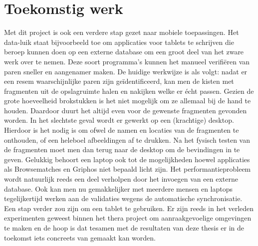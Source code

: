 \chapter{Toekomstig werk}
\label{toekomst}

Met dit project is ook een verdere stap gezet naar mobiele toepassingen. Het data-luik staat bijvoorbeeld toe om applicaties voor tablets te schrijven die beroep kunnen doen op een externe database om een groot deel van het zware werk over te nemen. Deze soort programma's kunnen het manueel verifi\"eren van paren sneller en aangenamer maken. De huidige werkwijze is als volgt: nadat er een resem waarschijnlijke paren zijn ge\"identificeerd, kan men de kisten met fragmenten uit de opslagruimte halen en nakijken welke er \'echt passen. Gezien de grote hoeveelheid brokstukken is het niet mogelijk om ze allemaal bij de hand te houden. Daardoor duurt het altijd even voor de gewenste fragmenten gevonden worden. In het slechtste geval wordt er gewerkt op een (krachtige) desktop. Hierdoor is het nodig is om ofwel de namen en locaties van de fragmenten te onthouden, of een heleboel afbeeldingen af te drukken. Na het fysisch testen van de fragmenten moet men dan terug naar de desktop om de bevindingen in te geven. Gelukkig behoort een laptop ook tot de mogelijkheden hoewel applicaties als Browsematches en Griphos niet bepaald licht zijn. Het performantieprobleem wordt natuurlijk reeds een deel verholpen door het invoegen van een externe database. Ook kan men nu gemakkelijker met meerdere mensen en laptops tegelijkertijd werken aan de validaties wegens de automatische synchronisatie. Een stap verder zou zijn om een tablet te gebruiken. Er zijn reeds in het verleden experimenten geweest binnen het thera project om aanraakgevoelige omgevingen te maken en de hoop is dat tesamen met de resultaten van deze thesis er in de toekomst iets concreets van gemaakt kan worden.